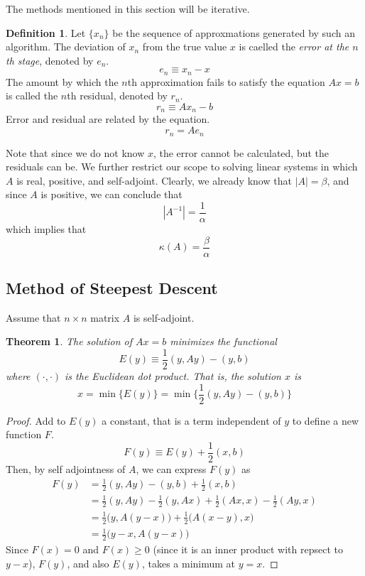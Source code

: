 \documentclass{article}
\newtheorem{theorem}{Theorem}[section]
\theoremstyle{remark}
\theoremstyle{definition}
\newtheorem{definition}{Definition}[section]
\begin{document}
  The methods mentioned in this section will be iterative. 
  \begin{definition}
  Let $\{ x_n\}$ be the sequence of approxmations generated by such an algorithm. The deviation of $x_n$ from the true value $x$ is caelled the \textit{error at the $n$th stage}, denoted by $e_n$. 
  \[e_n \equiv x_n - x\]
  The amount by which the $n$th approximation fails to satisfy the equation $Ax = b$ is called the $n$th residual, denoted by $r_n$. 
  \[r_n \equiv A x_n - b\]
  Error and residual are related by the equation. 
  \[r_n = A e_n\]
  \end{definition}
  Note that since we do not know $x$, the error cannot be calculated, but the residuals can be. We further restrict our scope to solving linear systems in which $A$ is real, positive, and self-adjoint. Clearly, we already know that $|A| = \beta$, and since $A$ is positive, we can conclude that 
  \[|A^{-1}| = \frac{1}{\alpha}\]
  which implies that
  \[\kappa(A) = \frac{\beta}{\alpha}\]

  \subsection{Method of Steepest Descent}

    Assume that $n \times n$ matrix $A$ is self-adjoint.
    \begin{theorem}
    The solution of $Ax = b$ minimizes the functional 
    \[E (y) \equiv \frac{1}{2} (y, A y) - (y, b)\]
    where $(\cdot, \cdot)$ is the Euclidean dot product. That is, the solution $x$ is
    \[x = \min \big\{ E(y) \big\} = \min \Big\{ \frac{1}{2} (y, Ay) - (y, b) \Big\}\]
    \end{theorem}
    \begin{proof}
    Add to $E(y)$ a constant, that is a term independent of $y$ to define a new function $F$. 
    \[F(y) \equiv E(y) + \frac{1}{2} (x, b)\]
    Then, by self adjointness of $A$, we can express $F(y)$ as 
    \begin{align*}
        F(y) & = \frac{1}{2} (y, Ay) - (y, b) + \frac{1}{2} (x, b) \\
        & = \frac{1}{2} (y, Ay) - \frac{1}{2} (y, Ax) + \frac{1}{2} (Ax, x) - \frac{1}{2} (Ay, x) \\
        & = \frac{1}{2} \big( y, A(y-x)\big) + \frac{1}{2} \big( A(x-y), x\big) \\
        & = \frac{1}{2} \big( y - x, A(y - x)\big) 
    \end{align*}
    Since $F(x) = 0$ and $F(x) \geq 0$ (since it is an inner product with repsect to $y-x$), $F(y)$, and also $E(y)$, takes a minimum at $y =x$. 
    \end{proof}
\end{document}
